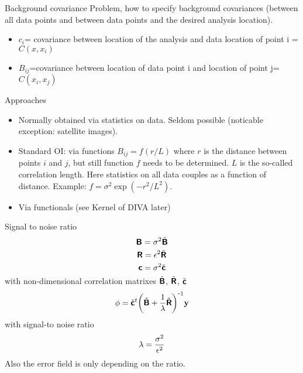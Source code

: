 \begin{frame}{Background covariance}
Problem, how to specify background covariances (between all data points and between data points and the desired analysis location).
\begin{itemize}
\item $c_i$= {covariance between location of the analysis and data location of point i} = $C(x,x_i)$
\item $B_{ij}$={covariance between location of data point i and  location of point j}= $C(x_i,x_j)$
\end{itemize}
Approaches
\begin{itemize}
\item
Normally obtained via statistics on data. Seldom possible (noticable exception: satellite images).
\item
Standard OI: via functions $B_{ij}= f(r/L)$ where $r$ is the distance between points $i$ and $j$, but still function $f$ needs to be determined. $L$ is the so-called correlation length. Here statistics on all data couples as a function of distance.
Example: $f=\sigma^2 \exp(-r^2/L^2)$.
\item Via functionals (see Kernel of DIVA later)
\end{itemize}
\end{frame}


\begin{frame}{Signal to noise ratio}
\begin{equation}
\mbox{\boldmath $ \protect\mathsf{B} $}= \sigma^2 \tilde{\mbox{\boldmath $ \protect\mathsf{B} $}}
\end{equation}
\begin{equation}
\mbox{\boldmath $ \protect\mathsf{R} $}= \epsilon^2 \tilde{\mbox{\boldmath $ \protect\mathsf{R} $}}
\end{equation}
\begin{equation}
\mbox{\boldmath $ \protect\mathsf{c} $}= \sigma^2 \tilde{\mbox{\boldmath $ \protect\mathsf{c} $}}
\end{equation}
with non-dimensional correlation matrixes $\tilde{\mbox{\boldmath $ \protect\mathsf{B} $}}$, $\tilde{\mbox{\boldmath $ \protect\mathsf{R} $}}$, $\tilde{\mbox{\boldmath $ \protect\mathsf{c} $}}$
\begin{equation}
\phi= {\tilde{\mbox{\boldmath $ \protect\mathsf{c} $}}}^t {\left( \tilde{\mbox{\boldmath $ \protect\mathsf{B} $}} + {1 \over \lambda} \tilde{\mbox{\boldmath $ \protect\mathsf{R} $}} \right)}^{ \mbox{\small{-}} 1} 
\mbox{\boldmath $ \protect\mathrm{y} $}
\label{eq:analyzedfield}
\end{equation}
with signal-to noise ratio
\begin{equation}
\lambda= {\sigma^2 \over \epsilon^2}
\end{equation}
Also the error field is only depending on the ratio.
\end{frame}


